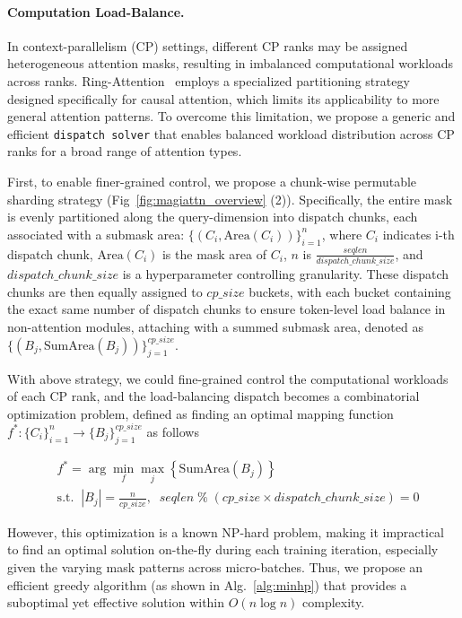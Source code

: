\paragraph{Computation Load-Balance.}\label{sec:magiattn_comp}




In context-parallelism (CP) settings, different CP ranks may be assigned heterogeneous attention masks, resulting in imbalanced computational workloads across ranks. Ring-Attention~\citep{ring_flash_attention_issue2} employs a specialized partitioning strategy designed specifically for causal attention, which limits its applicability to more general attention patterns. To overcome this limitation, we propose a generic and efficient \texttt{dispatch solver} that enables balanced workload distribution across CP ranks for a broad range of attention types.

First, to enable finer-grained control, we propose a chunk-wise permutable sharding strategy (Fig~\ref{fig:magiattn_overview} (2)). Specifically, the entire mask is evenly partitioned along the query-dimension into dispatch chunks, each associated with a submask area: $\{(C_i, \mathrm{Area}(C_i))\}_{i=1}^n$, where $C_i$ indicates i-th dispatch chunk, $\mathrm{Area}(C_i)$ is the mask area of $C_i$, $n$ is $\frac{seqlen}{dispatch\_chunk\_size}$, and $dispatch\_chunk\_size$ is a hyperparameter controlling granularity. 
These dispatch chunks are then equally assigned to $cp\_size$ buckets, with each bucket containing the exact same number of dispatch chunks to ensure token-level load balance in non-attention modules, attaching with a summed submask area, denoted as $\{(B_j, \mathrm{SumArea}(B_j))\}_{j=1}^{cp\_size}$.


With above strategy, we could fine-grained control the computational workloads of each CP rank, and the load-balancing dispatch becomes a combinatorial optimization problem, defined as finding an optimal mapping function $f^*: \{C_i\}_{i=1}^n \rightarrow \{B_j\}_{j=1}^{cp\_size}$ as follows

\begin{align}
    &f^* = \arg \min\limits_{f}\max\limits_{j}\left\{\mathrm{SumArea}(B_j)\right\} \label{eq:comp_load_balance}\\
    &\text{s.t.}\;\;|B_j| = \frac{n}{cp\_size}, \;\; seqlen \;\%\; (cp\_size \times dispatch\_chunk\_size) = 0\nonumber
\end{align}


However, this optimization is a known NP-hard problem, making it impractical to find an optimal solution on-the-fly during each training iteration, especially given the varying mask patterns across micro-batches. Thus, we propose an efficient greedy algorithm (as shown in Alg.~\ref{alg:minhp}) that provides a suboptimal yet effective solution within $O(n\log n)$ complexity.











